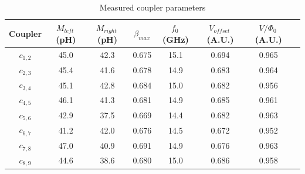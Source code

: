\begin{table}
    \caption{Measured coupler parameters}
    \centering
    \begin{tabular}{ c c c c c c c c}
        \hline \hline
        Coupler & $M_{left}$\,(pH) & $M_{right}$\,(pH) & $\beta_{max}$ & $f_{0}$\,(GHz) & $V_{offset}$\,(A.U.) & $V / \Phi_{0}$\,(A.U.) \\ %
        \hline
$c_{1,2}$ & 45.0 & 42.3 & 0.675 & 15.1 & 0.694 & 0.965\\ %
$c_{2,3}$ & 45.4 & 41.6 & 0.678 & 14.9 & 0.683 & 0.964\\ %
$c_{3,4}$ & 45.1 & 42.8 & 0.684 & 15.0 & 0.682 & 0.956\\ %
$c_{4,5}$ & 46.1 & 41.3 & 0.681 & 14.9 & 0.685 & 0.961\\ %
$c_{5,6}$ & 42.9 & 37.5 & 0.669 & 14.4 & 0.682 & 0.963\\ %
$c_{6,7}$ & 41.2 & 42.0 & 0.676 & 14.5 & 0.672 & 0.952\\ %
$c_{7,8}$ & 47.0 & 40.9 & 0.691 & 14.9 & 0.676 & 0.963\\ %
$c_{8,9}$ & 44.6 & 38.6 & 0.680 & 15.0 & 0.686 & 0.958\\ %
        \hline
    \end{tabular}
    \label{table:Coupler Parameters}
\end{table}


